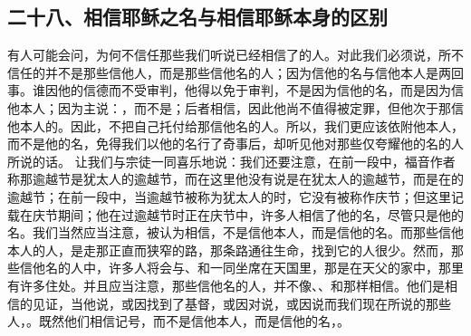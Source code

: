 
\subsection{二十八、相信耶稣之名与相信耶稣本身的区别}

有人可能会问，为何不信任那些我们听说已经相信了的人。对此我们必须说，所不信任的并不是那些信他人，而是那些信他名的人；因为信他的名与信他本人是两回事。谁因他的信德而不受审判，他得以免于审判，不是因为信他的名，而是因为信他本人；因为主说：，而不是；后者相信，因此他尚不值得被定罪，但他次于那信他本人的。因此，不把自己托付给那信他名的人。所以，我们更应该依附他本人，而不是他的名，免得我们以他的名行了奇事后，却听见他对那些仅夸耀他的名的人所说的话。 让我们与宗徒一同喜乐地说：我们还要注意，在前一段中，福音作者称那逾越节是犹太人的逾越节，而在这里他没有说是在犹太人的逾越节，而是在的逾越节；在前一段中，当逾越节被称为犹太人的时，它没有被称作庆节；但这里记载在庆节期间；他在过逾越节时正在庆节中，许多人相信了他的名，尽管只是他的名。我们当然应当注意，被认为相信，不是信他本人，而是信他的名。而那些信他本人的人，是走那正直而狭窄的路，那条路通往生命，找到它的人很少。然而，那些信他名的人中，许多人将会与、和一同坐席在天国里，那是在天父的家中，那里有许多住处。并且应当注意，那些信他名的人，并不像、、和那样相信。他们是相信的见证，当他说，或因找到了基督，或因对说，或因说而我们现在所说的那些人，。既然他们相信记号，而不是信他本人，而是信他的名，。\par

